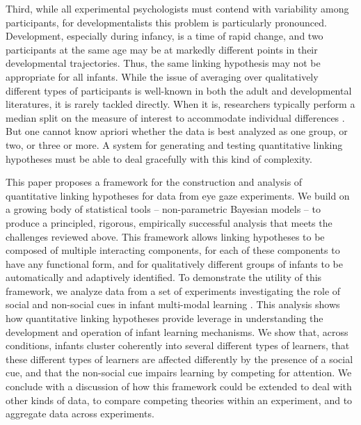 \documentclass[12pt]{article}
\begin{document}
	Third, while all experimental psychologists must contend with variability among participants, for developmentalists this problem is particularly pronounced. Development, especially during infancy, is a time of rapid change, and two participants at the same age may be at markedly different points in their developmental trajectories. Thus, the same linking hypothesis may not be appropriate for all infants. While the issue of averaging over qualitatively different types of participants is well-known in both the adult \cite{Estes1956, Gallistel2004} and developmental \cite{Siegler1987} literatures, it is rarely tackled directly. When it is, researchers typically perform a median split on the measure of interest to accommodate individual differences \cite{Marchman2008, Mather2010a}. But one cannot know apriori whether the data is best analyzed as one group, or two, or three or more. A system for generating and testing quantitative linking hypotheses must be able to deal gracefully with this kind of complexity.
	
	This paper proposes a framework for the construction and analysis of quantitative linking hypotheses for data from eye gaze experiments. We build on a growing body of statistical tools -- non-parametric Bayesian models -- to produce a principled, rigorous, empirically successful analysis that meets the challenges reviewed above. This framework allows linking hypotheses to be composed of multiple interacting components, for each of these components to have any functional form, and for qualitatively different groups of infants to be automatically and adaptively identified. To demonstrate the utility of this framework, we analyze data from a set of experiments investigating the role of social and non-social cues in infant multi-modal learning \cite{Wu2010a}. This analysis shows how quantitative linking hypotheses provide leverage in understanding the development and operation of infant learning mechanisms. We show that, across conditions, infants cluster coherently into several different types of learners, that these different types of learners are affected differently by the presence of a social cue, and that the non-social cue impairs learning by competing for attention. We conclude with a discussion of how this framework could be extended to deal with other kinds of data, to compare competing theories within an experiment, and to aggregate data across experiments.
	
\end{document}
